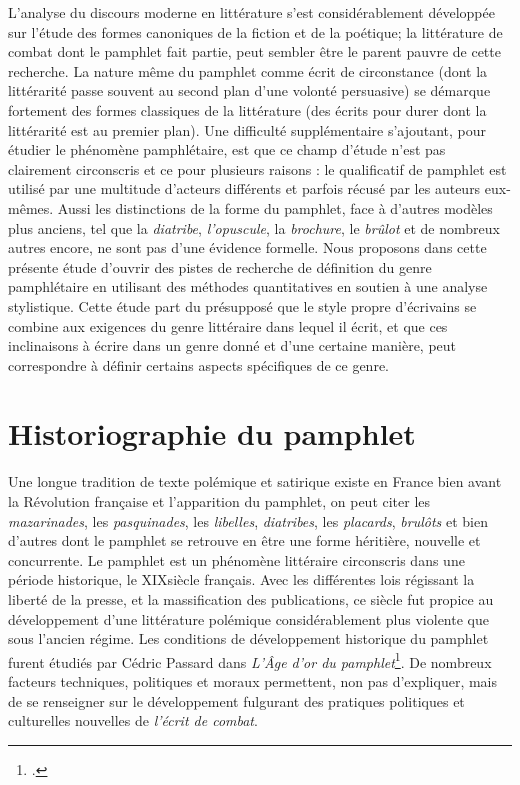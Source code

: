 L'analyse du discours moderne en littérature s'est considérablement développée sur l'étude des formes canoniques de la fiction et de la poétique; la littérature de combat dont le pamphlet fait partie, peut sembler être le parent pauvre de cette recherche. La nature même du pamphlet comme écrit de circonstance (dont la littérarité passe souvent au second plan d'une volonté persuasive) se démarque fortement des formes classiques de la littérature (des écrits pour durer dont la littérarité est au premier plan). Une difficulté supplémentaire s'ajoutant, pour étudier le phénomène pamphlétaire, est que ce champ d'étude n'est pas clairement circonscris et ce pour plusieurs raisons : le qualificatif de pamphlet est utilisé par une multitude d'acteurs différents et parfois récusé par les auteurs eux-mêmes. Aussi les distinctions de la forme du pamphlet, face à d'autres modèles plus anciens, tel que la \textit{diatribe}, \textit{l'opuscule}, la \textit{brochure}, le \textit{brûlot} et de nombreux autres encore, ne sont pas d'une évidence formelle. Nous proposons dans cette présente étude d'ouvrir des pistes de recherche de définition du genre pamphlétaire en utilisant des méthodes quantitatives en soutien à une analyse stylistique. Cette étude part du présupposé que le style propre d'écrivains se combine aux exigences du genre littéraire dans lequel il écrit, et que ces inclinaisons à écrire dans un genre donné et d'une certaine manière, peut correspondre à définir certains aspects spécifiques de ce genre.

\chapter{Historiographie du pamphlet}

Une longue tradition de texte polémique et satirique existe en France bien avant la Révolution française et l'apparition du pamphlet, on peut citer les \textit{mazarinades}, les \textit{pasquinades}, les \textit{libelles}, \textit{diatribes}, les \textit{placards}, \textit{brulôts} et bien d'autres dont le pamphlet se retrouve en être une forme héritière, nouvelle et concurrente.
Le pamphlet est un phénomène littéraire circonscris dans une période historique, le XIX\ieme siècle français. Avec les différentes lois régissant la liberté de la presse, et la massification des publications, ce siècle fut propice au développement d'une littérature polémique considérablement plus violente que sous l'ancien régime. Les conditions de développement historique du pamphlet furent étudiés par Cédric Passard dans \textit{L'Âge d'or du pamphlet}\footcites{passard_lage_2015}. De nombreux facteurs techniques, politiques et moraux permettent, non pas d'expliquer, mais de se renseigner sur le développement fulgurant des pratiques politiques et culturelles nouvelles de \textit{l'écrit de combat}.

